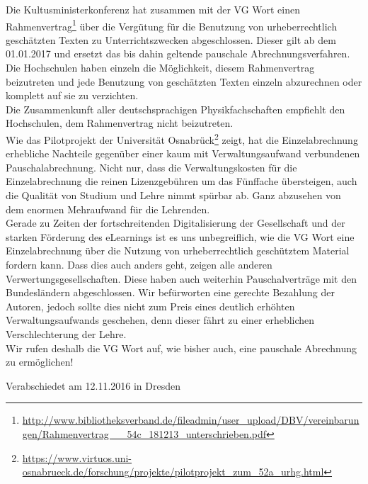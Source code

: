 \documentclass[DIV=calc]{scrartcl}
\begin{document}
   Die Kultusministerkonferenz hat zusammen mit der VG Wort einen Rahmenvertrag\footnote{ \url{http://www.bibliotheksverband.de/fileadmin/user_upload/DBV/vereinbarungen/Rahmenvertrag __54c_181213_unterschrieben.pdf}} über die Vergütung für die Benutzung von urheberrechtlich geschätzten Texten zu Unterrichtszwecken abgeschlossen. Dieser gilt ab dem 01.01.2017 und ersetzt das bis dahin geltende pauschale Abrechnungsverfahren. Die Hochschulen haben einzeln die Möglichkeit, diesem Rahmenvertrag beizutreten und jede Benutzung von geschätzten Texten einzeln abzurechnen oder komplett auf sie zu verzichten. \\   
Die Zusammenkunft aller deutschsprachigen Physikfachschaften empfiehlt den Hochschulen, dem Rahmenvertrag nicht beizutreten. \\
Wie das Pilotprojekt der Universität Osnabrück\footnote{ \url{https://www.virtuos.uni-osnabrueck.de/forschung/projekte/pilotprojekt_zum_52a_urhg.html}} zeigt, hat die Einzelabrechnung erhebliche Nachteile gegenüber einer kaum mit Verwaltungsaufwand verbundenen Pauschalabrechnung. Nicht nur, dass die Verwaltungskosten für die Einzelabrechnung die reinen Lizenzgebühren um das Fünffache übersteigen, auch die Qualität von Studium und Lehre nimmt spürbar ab. Ganz abzusehen von dem enormen Mehraufwand für die Lehrenden. \\
Gerade zu Zeiten der fortschreitenden Digitalisierung der Gesellschaft und der starken Förderung des eLearnings ist es uns unbegreiflich, wie die VG Wort eine Einzelabrechnung über die Nutzung von urheberrechtlich geschütztem Material fordern kann. Dass dies auch anders geht, zeigen alle anderen Verwertungsgesellschaften. Diese haben auch weiterhin Pauschalverträge mit den Bundesländern abgeschlossen.
Wir befürworten eine gerechte Bezahlung der Autoren, jedoch sollte dies nicht zum Preis eines deutlich erhöhten Verwaltungsaufwands geschehen, denn dieser fährt zu einer erheblichen Verschlechterung der Lehre.  \\
Wir rufen deshalb die VG Wort auf, wie bisher auch, eine pauschale Abrechnung zu ermöglichen!
    
    \vfill
    \begin{flushright}
        Verabschiedet am 12.11.2016 in Dresden
    \end{flushright}
    
    
    
    
\end{document}
